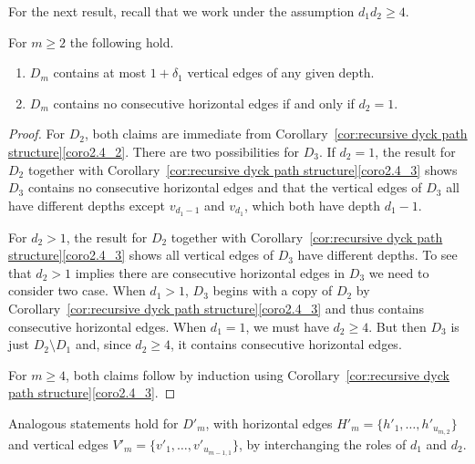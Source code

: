 For the next result, recall that we work under the assumption $d_1d_2\ge4$.
\begin{corollary}
 \label{cor:edge restrictions}
 For $m\ge2$ the following hold.
 \begin{enumerate}[label=(\alph*)]
 \item $D_m$ contains at most $1+\delta_1$ vertical edges of any given depth.
 \item $D_m$ contains no consecutive horizontal edges if and only if $d_2=1$.
 \end{enumerate}
\end{corollary}
\begin{proof}
 For $D_2$, both claims are immediate from Corollary~\ref{cor:recursive dyck path structure}\ref{coro2.4_2}.
 There are two possibilities for $D_3$.
 If $d_2=1$, the result for $D_2$ together with Corollary~\ref{cor:recursive dyck path structure}\ref{coro2.4_3} shows $D_3$ contains no consecutive horizontal edges and that the vertical edges of $D_3$ all have different depths except $v_{d_1-1}$ and $v_{d_1}$, which both have depth $d_1-1$.
 
 For $d_2>1$, the result for $D_2$ together with Corollary~\ref{cor:recursive dyck path structure}\ref{coro2.4_3} shows all vertical edges of $D_3$ have different depths.
 To see that $d_2>1$ implies there are consecutive horizontal edges in $D_3$ we need to consider two case.
 When $d_1>1$, $D_3$ begins with a copy of $D_2$ by Corollary~\ref{cor:recursive dyck path structure}\ref{coro2.4_3} and thus contains consecutive horizontal edges.
 When $d_1=1$, we must have $d_2\ge4$.
 But then $D_3$ is just $D_2\setminus D_1$ and, since $d_2\ge4$, it contains consecutive horizontal edges. 

 For $m\ge4$, both claims follow by induction using Corollary~\ref{cor:recursive dyck path structure}\ref{coro2.4_3}.
\end{proof}
Analogous statements hold for $D'_m$, with horizontal edges $H'_m=\{h'_1,\ldots,h'_{u_{m,2}}\}$ and vertical edges $V'_m=\{v'_1,\ldots,v'_{u_{m-1,1}}\}$, by interchanging the roles of $d_1$ and $d_2$.

